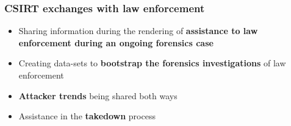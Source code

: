 \begin{frame}
    \frametitle{CSIRT exchanges with law enforcement}
    \begin{itemize}
        \item Sharing information during the rendering of {\bf assistance to law enforcement during an ongoing forensics case}
        \item Creating data-sets to {\bf bootstrap the forensics investigations} of law enforcement
        \item {\bf Attacker trends} being shared both ways
        \item Assistance in the {\bf takedown} process
    \end{itemize}

\end{frame}

